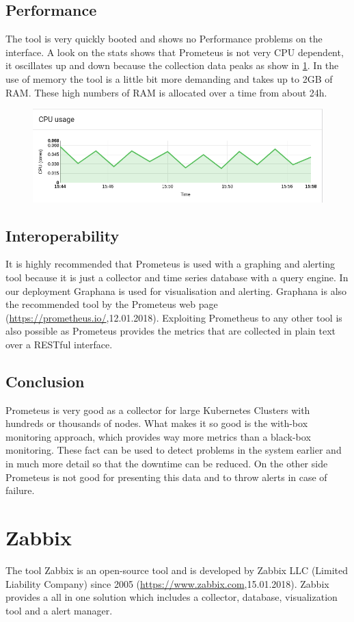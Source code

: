 \subsection{Performance}
The tool is very quickly booted and shows no Performance problems on the interface. A look on the stats shows that Prometeus is not very CPU dependent, it oscillates up and down because the collection data peaks as show in \cref{fig:Prometeus_Cpu}. In the use of memory the tool is a little bit more demanding and takes up to 2GB of RAM. These high numbers of RAM is allocated over a time from about 24h. 
\begin{figure}
\centering
\includegraphics[width=0.7\linewidth]{Bilder/Performance/Prometeus_Cpu}
\caption{}
\label{fig:Prometeus_Cpu}
\end{figure}
\subsection{Interoperability}
It is highly recommended that Prometeus is used with a graphing and alerting tool because it is just a collector and time series database with a query engine. In our deployment Graphana is used for visualisation and alerting. Graphana is also the recommended tool by the Prometeus web page (\url{https://prometheus.io/},12.01.2018). Exploiting Prometheus to any other tool is also possible as Prometeus provides the metrics that are collected in plain text over a RESTful interface.
\subsection{Conclusion}
Prometeus is very good as a collector for large Kubernetes Clusters with hundreds or thousands of nodes. What makes it so good is the with-box monitoring approach, which provides way more metrics than a black-box monitoring. These fact can be used to detect problems in the system earlier and in much more detail so that the downtime can be reduced. On the other side Prometeus is not good for presenting this data and to throw alerts in case of failure.

\section{Zabbix}
\label{Zabbix} %
\cite{Hernantes2015}
The tool Zabbix is an open-source tool and is developed by Zabbix LLC (Limited Liability Company) since 2005 (\url{https://www.zabbix.com},15.01.2018). Zabbix provides a all in one solution which includes a collector, database, visualization tool and a alert manager.
